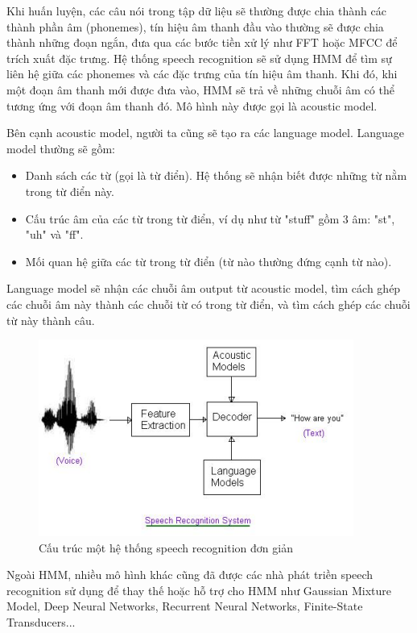 Khi huấn luyện, các câu nói trong tập dữ liệu sẽ thường được chia thành các thành phần âm (phonemes), tín hiệu âm thanh đầu vào thường sẽ được chia thành những đoạn ngắn, đưa qua các bước tiền xử lý như FFT hoặc MFCC để trích xuất đặc trưng. Hệ thống speech recognition sẽ sử dụng HMM để tìm sự liên hệ giữa các phonemes và các đặc trưng của tín hiệu âm thanh. Khi đó, khi một đoạn âm thanh mới được đưa vào, HMM sẽ trả về những chuỗi âm có thể tương ứng với đoạn âm thanh đó. Mô hình này được gọi là acoustic model.

Bên cạnh acoustic model, người ta cũng sẽ tạo ra các language model. Language model thường sẽ gồm:

\begin{itemize}
    \item Danh sách các từ (gọi là từ điển). Hệ thống sẽ nhận biết được những từ nằm trong từ điển này.
    \item Cấu trúc âm của các từ trong từ điển, ví dụ như từ "stuff" gồm 3 âm: "st", "uh" và "ff".
    \item Mối quan hệ giữa các từ trong từ điển (từ nào thường đứng cạnh từ nào).
\end{itemize}

Language model sẽ nhận các chuỗi âm output từ acoustic model, tìm cách ghép các chuỗi âm này thành các chuỗi từ có trong từ điển, và tìm cách ghép các chuỗi từ này thành câu.

\begin{figure}[h]
    \centering
    \includegraphics[scale=1]{SRSystem}\footnotemark
    \caption{Cấu trúc một hệ thống speech recognition đơn giản}
    \label{fig:c3_SRSystem}
\end{figure}


Ngoài HMM, nhiều mô hình khác cũng đã được các nhà phát triền speech recognition sử dụng để thay thế hoặc hỗ trợ cho HMM như Gaussian Mixture Model, Deep Neural Networks, Recurrent Neural Networks, Finite-State Transducers...

